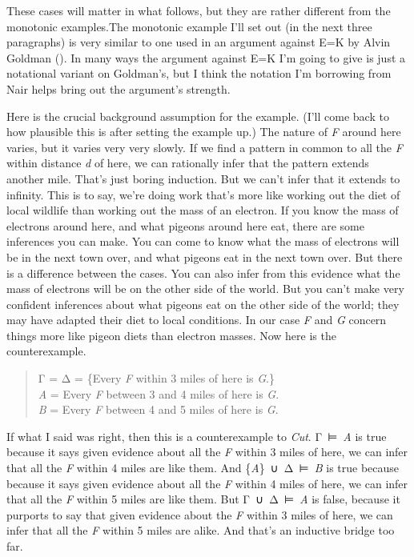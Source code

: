 \documentclass[
  12pt,
  letterpaper,
]{scrbook}
\begin{document}
These cases will matter in what follows, but they are rather different
from the monotonic examples.The monotonic example I'll set out (in the
next three paragraphs) is very similar to one used in an argument
against E=K by Alvin Goldman (). In many
ways the argument against E=K I'm going to give is just a notational
variant on Goldman's, but I think the notation I'm borrowing from Nair
helps bring out the argument's strength.

Here is the crucial background assumption for the example. (I'll come
back to how plausible this is after setting the example up.) The nature
of \emph{F} around here varies, but it varies very very slowly. If we
find a pattern in common to all the \emph{F} within distance \emph{d} of
here, we can rationally infer that the pattern extends another mile.
That's just boring induction. But we can't infer that it extends to
infinity. This is to say, we're doing work that's more like working out
the diet of local wildlife than working out the mass of an electron. If
you know the mass of electrons around here, and what pigeons around here
eat, there are some inferences you can make. You can come to know what
the mass of electrons will be in the next town over, and what pigeons
eat in the next town over. But there is a difference between the cases.
You can also infer from this evidence what the mass of electrons will be
on the other side of the world. But you can't make very confident
inferences about what pigeons eat on the other side of the world; they
may have adapted their diet to local conditions. In our case \emph{F}
and \emph{G} concern things more like pigeon diets than electron masses.
Now here is the counterexample.

\begin{quote}
Γ = Δ = \{Every \emph{F} within 3 miles of here is \emph{G}.\}\\
\emph{A} = Every \emph{F} between 3 and 4 miles of here is \emph{G}.\\
\emph{B} = Every \emph{F} between 4 and 5 miles of here is \emph{G}.
\end{quote}

If what I said was right, then this is a counterexample to \emph{Cut}.
Γ~⊨~\emph{A} is true because it says given evidence about all the
\emph{F} within 3 miles of here, we can infer that all the \emph{F}
within 4 miles are like them. And \{\emph{A}\}~∪~Δ~⊨~\emph{B} is true
because because it says given evidence about all the \emph{F} within 4
miles of here, we can infer that all the \emph{F} within 5 miles are
like them. But Γ~∪~Δ~⊨~\emph{A} is false, because it purports to say
that given evidence about the \emph{F} within 3 miles of here, we can
infer that all the \emph{F} within 5 miles are alike. And that's an
inductive bridge too far.
\end{document}
